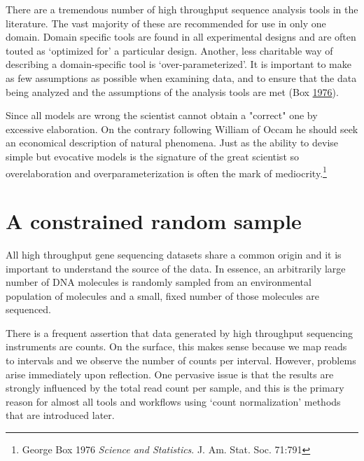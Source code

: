\documentclass[onecolumn]{book}
\let\rmarkdownfootnote\footnote%
\def\footnote{\protect\rmarkdownfootnote}
\theoremstyle{definition}
\theoremstyle{definition}
\theoremstyle{definition}
\theoremstyle{remark}
\begin{document}
There are a tremendous number of high throughput sequence analysis tools
in the literature. The vast majority of these are recommended for use in
only one domain. Domain specific tools are found in all experimental
designs and are often touted as `optimized for' a particular design.
Another, less charitable way of describing a domain-specific tool is
`over-parameterized'. It is important to make as few assumptions as
possible when examining data, and to ensure that the data being analyzed
and the assumptions of the analysis tools are met (Box
\protect\hyperlink{ref-box:1976}{1976}).

\hspace{2cm}\begin{minipage}[ct]{10cm}
\parskip=5pt
\parindent=5pt

Since all models are wrong the scientist cannot obtain a "correct" one by excessive elaboration. On the contrary following William of Occam he should seek an economical description of natural phenomena. Just as the ability to devise simple but evocative models is the signature of the great scientist so overelaboration and overparameterization is often the mark of mediocrity.\footnote{George Box 1976 \emph{Science and Statistics}. J. Am. Stat. Soc. 71:791}

\end{minipage}

\hypertarget{a-constrained-random-sample}{%
\section{A constrained random
sample}\label{a-constrained-random-sample}}

All high throughput gene sequencing datasets share a common origin and
it is important to understand the source of the data. In essence, an
arbitrarily large number of DNA molecules is randomly sampled from an
environmental population of molecules and a small, fixed number of those
molecules are sequenced.

There is a frequent assertion that data generated by high throughput
sequencing instruments are counts. On the surface, this makes sense
because we map reads to intervals and we observe the number of counts
per interval. However, problems arise immediately upon reflection. One
pervasive issue is that the results are strongly influenced by the total
read count per sample, and this is the primary reason for almost all
tools and workflows using `count normalization' methods that are
introduced later.
\end{document}
